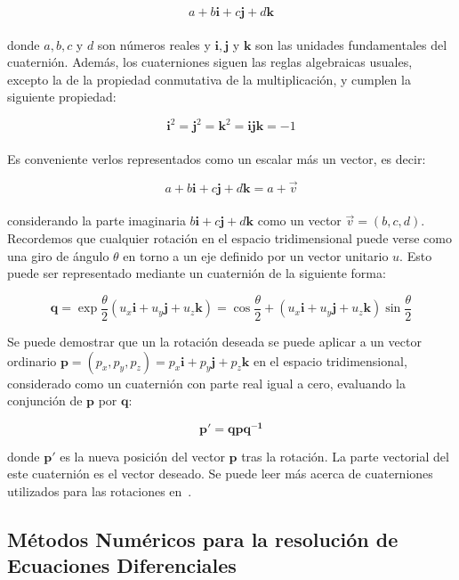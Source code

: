 \[a + b\boldsymbol{i} + c\boldsymbol{j} + d\boldsymbol{k} \] \\

donde $a,b,c$ y $d$ son números reales y $\boldsymbol{i}, \boldsymbol{j}$ y
$\boldsymbol{k}$
son las unidades fundamentales del cuaternión. Además, los cuaterniones  siguen
las reglas algebraicas usuales, excepto la de la propiedad conmutativa de la
multiplicación, y cumplen la siguiente propiedad:

\[\boldsymbol{i}^2 = \boldsymbol{j}^2 = \boldsymbol{k}^2 = \boldsymbol{ijk} = -1 \]\\

Es conveniente verlos representados como un escalar más un vector, es decir:

\[a + b\boldsymbol{i} + c\boldsymbol{j} + d\boldsymbol{k} = a +
\overrightarrow{v} \] \\

considerando la parte imaginaria $b\boldsymbol{i} + c\boldsymbol{j} +
d\boldsymbol{k}$ como un vector $\overrightarrow{v} = (b,c,d)$. \\

Recordemos que cualquier rotación en el espacio tridimensional puede verse como
una giro de ángulo $\theta$ en torno a un eje definido por un vector unitario
$u$. Esto puede ser representado mediante un cuaternión de la siguiente forma:

\[\boldsymbol{q} = \exp{\frac{\theta}{2}(u_x\boldsymbol{i} + u_y\boldsymbol{j} +
		u_z\boldsymbol{k})} = \cos{\frac{\theta}{2}} + (u_x\boldsymbol{i} + 
u_y\boldsymbol{j} + u_z\boldsymbol{k})\sin{\frac{\theta}{2}} \]

Se puede demostrar que un la rotación deseada se puede aplicar a un vector
ordinario $\boldsymbol{p} = (p_x, p_y, p_z) = p_x\boldsymbol{i} +
p_y\boldsymbol{j} + p_z\boldsymbol{k}$ en el espacio tridimensional, considerado
como un cuaternión con parte real igual a cero, evaluando la conjunción de
$\boldsymbol{p}$ por $\boldsymbol{q}$:

\[ \boldsymbol{p'} = \boldsymbol{qpq^{-1}} \]

donde $\boldsymbol{p'}$ es la nueva posición del vector $\boldsymbol{p}$ tras la
rotación. La parte vectorial del este cuaternión es el vector deseado. Se puede
leer más acerca de cuaterniones utilizados para las rotaciones en~\citet{Vicci}.

\subsection{Métodos Numéricos para la resolución de Ecuaciones Diferenciales} 
\label{makereference5.4.3}

